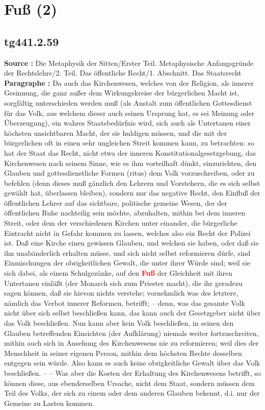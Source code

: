 \documentclass[a4paper,12pt,twoside]{book}
\newcommand{\match}[1]{\textcolor{red}{\textbf{#1}}}
\newcommand{\unnumberedsection}[1]{
	\section*{#1}
	\addcontentsline{toc}{section}{#1}
	\markright{#1}
}
\begin{document}
	\unnumberedsection{Fuß (2)} 
	\subsection*{tg441.2.59} 
	\textbf{Source : }Die Metaphysik der Sitten/Erster Teil. Metaphysische Anfangsgründe der Rechtslehre/2. Teil. Das öffentliche Recht/1. Abschnitt. Das Staatsrecht\\  
	
	\textbf{Paragraphe : }Da auch das Kirchenwesen, welches von der Religion, als innerer Gesinnung, die ganz außer dem Wirkungskreise der bürgerlichen Macht ist, sorgfältig unterschieden werden muß (als Anstalt zum öffentlichen Gottesdienst für das Volk, aus welchem dieser auch seinen Ursprung hat, es sei Meinung oder Überzeugung), ein wahres Staatsbedürfnis  wird, sich auch als Untertanen einer höchsten unsichtbaren Macht, der sie huldigen müssen, und die mit der bürgerlichen oft in einen sehr ungleichen Streit kommen kann, zu betrachten: so hat der Staat das Recht, nicht etwa der inneren Konstitutionalgesetzgebung, das Kirchenwesen nach seinem Sinne, wie es ihm vorteilhaft dünkt, einzurichten, den Glauben und gottesdienstliche Formen (ritus) dem Volk vorzuschreiben, oder zu befehlen (denn dieses muß gänzlich den Lehrern und Vorstehern, die es sich selbst gewählt hat, überlassen bleiben), sondern nur das negative Recht, den Einfluß der öffentlichen Lehrer auf das sichtbare, politische gemeine Wesen, der der öffentlichen Ruhe nachteilig sein möchte, abzuhalten, mithin bei dem inneren Streit, oder dem der verschiedenen Kirchen unter einander, die bürgerliche Eintracht nicht in Gefahr kommen zu lassen, welches also ein Recht der Polizei ist. Daß eine Kirche einen gewissen Glauben, und welchen sie haben, oder daß sie ihn unabänderlich erhalten müsse, und sich nicht selbst reformieren dürfe, sind Einmischungen der obrigkeitlichen Gewalt, die unter ihrer Würde sind; weil sie sich dabei, als einem Schulgezänke, auf den \match{Fuß} der Gleichheit mit ihren Untertanen einläßt (der Monarch sich zum Priester macht), die ihr geradezu sagen können, daß sie hievon nichts verstehe; vornehmlich was des letztere, nämlich das Verbot innerer Reformen, betrifft; – denn, was das gesamte Volk nicht über sich selbst beschließen kann, das kann auch der Gesetzgeber nicht über das Volk beschließen. Nun kann aber kein Volk beschließen, in seinen den Glauben betreffenden Einsichten (der Aufklärung) niemals weiter fortzuschreiten, mithin auch sich in Ansehung des Kirchenwesens nie zu reformieren; weil dies der Menschheit in seiner eigenen Person, mithin dem höchsten Rechte desselben entgegen sein würde. Also kann es auch keine obrigkeitliche Gewalt über das Volk beschließen. – – Was aber die Kosten der Erhaltung des Kirchenwesens betrifft, so können diese, aus ebenderselben Ursache, nicht dem Staat, sondern müssen dem Teil des Volks, der sich zu einem oder dem anderen Glauben bekennt, d.i. nur der Gemeine zu Lasten kommen. 
	
\end{document}
